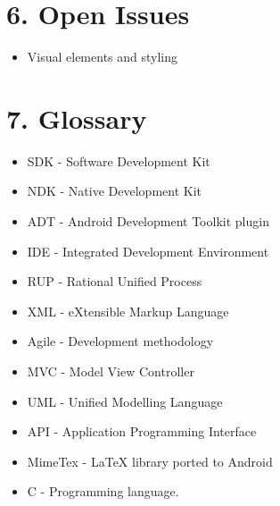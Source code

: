 \documentclass[29pt,a4paper]{moderncv}
\begin{document}
\newpage	
	\section*{\textbf{6. Open Issues}}
	\vspace{4mm}
		\begin{itemize}
			\item Visual elements and styling
		\end{itemize}
	\vspace{5mm}

\newpage	
	\section*{\textbf{7. Glossary}}
	\vspace{4mm}
		\begin{itemize}
			\item SDK - Software Development Kit
			\item NDK - Native Development Kit
			\item ADT - Android Development Toolkit plugin
			\item IDE - Integrated Development Environment
			\item RUP - Rational Unified Process
			\item XML - eXtensible Markup Language
			\item Agile - Development methodology
			\item MVC - Model View Controller
			\item UML - Unified Modelling Language
			\item API - Application Programming Interface
			\item MimeTex - LaTeX library ported to Android
			\item C - Programming language.
			
		\end{itemize}
	\vspace{5mm}
\end{document}
